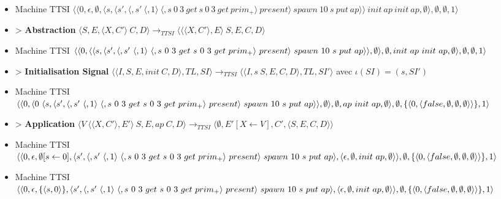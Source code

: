 \documentclass[10pt,a4paper]{article}
\begin{document}
				\begin{itemize}
					\item[] Machine TTSI $\langle\langle 0,\epsilon,\emptyset,\langle s,\langle s', \langle, s'~\langle,1\rangle~\langle,s~0~3~get~s~0~3~get~prim_{+}\rangle~present\rangle~spawn~10~s~put~ap\rangle\rangle~init~ap~init~ap,\emptyset\rangle,\emptyset,\emptyset,1\rangle$
					\item[] > \textbf{Abstraction} $\langle S,E,\langle X,C'\rangle~C,D\rangle
					\longrightarrow_{TTSI} 
					\langle \langle\langle X,C'\rangle,E\rangle~S,E,C,D\rangle$
					\item[] Machine TTSI $\langle\langle 0,\langle\langle s,\langle s', \langle, s'~\langle,1\rangle~\langle,s~0~3~get~s~0~3~get~prim_{+}\rangle~present\rangle~spawn~10~s~put~ap\rangle\rangle,\emptyset \rangle,\emptyset,init~ap~init~ap,\emptyset\rangle,\\\emptyset,\emptyset,1\rangle$
					\item[] > \textbf{Initialisation Signal} $\langle\langle I,S,E,init~C,D\rangle,TL,SI\rangle 
					\longrightarrow_{TTSI}
					\langle\langle I,s~S,E,C,D\rangle,TL,SI'\rangle$
					avec $\iota(SI) = (s,SI')$
					\item[] Machine TTSI $\langle\langle 0,\langle 0~\langle s,\langle s', \langle, s'~\langle,1\rangle~\langle,s~0~3~get~s~0~3~get~prim_{+}\rangle~present\rangle~spawn~10~s~put~ap\rangle\rangle,\emptyset \rangle,\emptyset,ap~init~ap,\emptyset\rangle,\\\emptyset,\{\langle 0,\langle false,\emptyset,\emptyset,\emptyset\rangle\rangle\},1\rangle$
					\item[] > \textbf{Application} $\langle V~\langle\langle X,C'\rangle,E'\rangle~S,E,ap~C,D\rangle
					\longrightarrow_{TTSI} 
					\langle \emptyset,E'[X \leftarrow V],C',\langle S,E,C,D\rangle\rangle$
					\item[] Machine TTSI $\langle\langle 0,\epsilon,\emptyset[s \leftarrow 0],\langle s', \langle, s'~\langle,1\rangle~\langle,s~0~3~get~s~0~3~get~prim_{+}\rangle~present\rangle~spawn~10~s~put~ap\rangle,\langle\epsilon,\emptyset,init~ap,\emptyset\rangle\rangle,\\\emptyset,\{\langle 0,\langle false,\emptyset,\emptyset,\emptyset\rangle\rangle\},1\rangle$
					\item[] Machine TTSI $\langle\langle 0,\epsilon,\{\langle s,0\rangle\},\langle s', \langle, s'~\langle,1\rangle~\langle,s~0~3~get~s~0~3~get~prim_{+}\rangle~present\rangle~spawn~10~s~put~ap\rangle,\langle\epsilon,\emptyset,init~ap,\emptyset\rangle\rangle,\\\emptyset,\{\langle 0,\langle false,\emptyset,\emptyset,\emptyset\rangle\rangle\},1\rangle$

\end{itemize}
\end{document}
